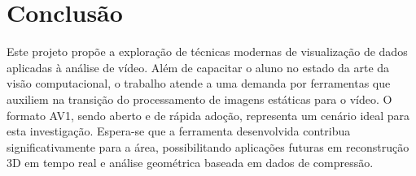 \documentclass[a4paper,titlepage]{article}
\begin{document}
\section{Conclusão}

Este projeto propõe a exploração de técnicas modernas de visualização de dados aplicadas à análise de vídeo. Além de capacitar o aluno no estado da arte da visão computacional, o trabalho atende a uma demanda por ferramentas que auxiliem na transição do processamento de imagens estáticas para o vídeo. O formato AV1, sendo aberto e de rápida adoção, representa um cenário ideal para esta investigação. Espera-se que a ferramenta desenvolvida contribua significativamente para a área, possibilitando aplicações futuras em reconstrução 3D em tempo real e análise geométrica baseada em dados de compressão.

\vspace{1cm}



\end{document}
